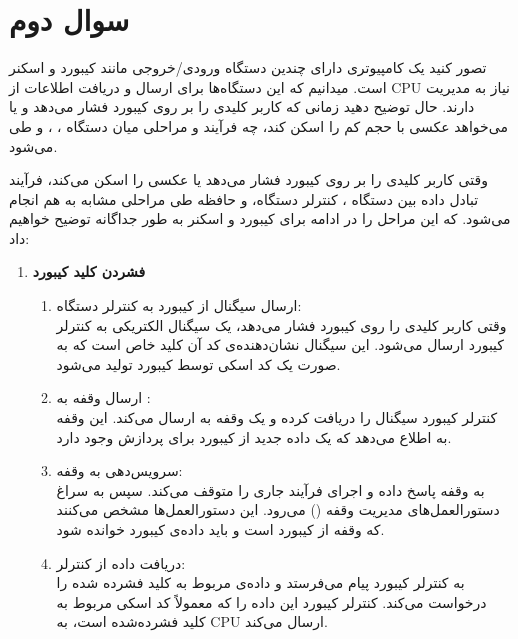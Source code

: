 \section{سوال دوم}

تصور کنید یک کامپیوتری دارای چندین دستگاه ورودی/خروجی  مانند کیبورد و اسکنر است. میدانیم که این دستگاه‌ها برای ارسال و دریافت اطلاعات از CPU نیاز به مدیریت دارند. حال توضیح دهید زمانی که کاربر کلیدی را بر روی کیبورد فشار می‌دهد و یا می‌خواهد عکسی با حجم کم را اسکن کند، چه فرآیند و مراحلی میان دستگاه ، ،  و  طی می‌شود.


\begin{qsolve}[]
	وقتی کاربر کلیدی را بر روی کیبورد فشار می‌دهد یا عکسی را اسکن می‌کند، فرآیند تبادل داده بین دستگاه ، کنترلر دستگاه،  و حافظه طی مراحلی مشابه به هم انجام می‌شود. که این مراحل را در ادامه برای کیبورد و اسکنر به طور جداگانه توضیح خواهیم داد:
	
	\begin{enumerate}
		\item 
		\textbf{فشردن کلید کیبورد}
		
		\begin{enumerate}
			\item
			ارسال سیگنال از کیبورد به کنترلر دستگاه:\\
			وقتی کاربر کلیدی را روی کیبورد فشار می‌دهد، یک سیگنال الکتریکی به کنترلر کیبورد ارسال می‌شود. این سیگنال نشان‌دهنده‌ی کد آن کلید خاص است که به صورت یک کد اسکی توسط کیبورد تولید می‌شود.
			
			\item 
			ارسال وقفه به :\\
			کنترلر کیبورد سیگنال را دریافت کرده و یک وقفه به  ارسال می‌کند. این وقفه به  اطلاع می‌دهد که یک داده جدید از کیبورد برای پردازش وجود دارد.
			
			\item 
			سرویس‌دهی به وقفه:\\
			به وقفه پاسخ داده و اجرای فرآیند جاری را متوقف می‌کند. سپس  به سراغ دستورالعمل‌های مدیریت وقفه () می‌رود. این دستورالعمل‌ها مشخص می‌کنند که وقفه از کیبورد است و باید داده‌ی کیبورد خوانده شود.
			
			\item 
			دریافت داده از کنترلر:\\
			به کنترلر کیبورد پیام می‌فرستد و داده‌ی مربوط به کلید فشرده شده را درخواست می‌کند. کنترلر کیبورد این داده را که معمولاً کد اسکی مربوط به کلید فشرده‌شده است، به CPU ارسال می‌کند.
			

\end{enumerate}
\end{enumerate}
\end{qsolve}
